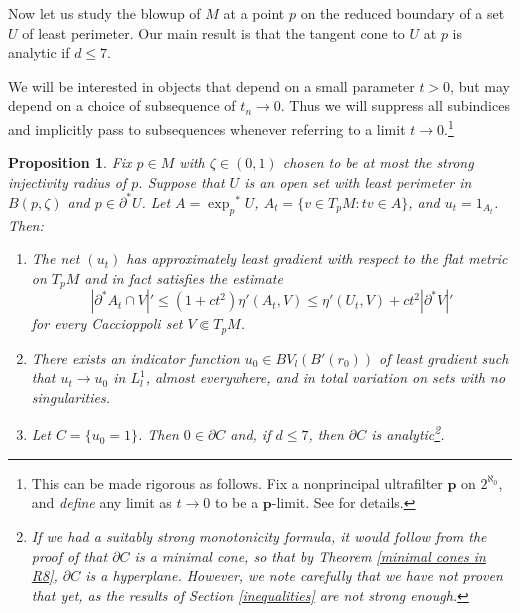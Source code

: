 \documentclass[reqno,12pt,letterpaper]{amsart}
\newtheorem{proposition}[theorem]{Proposition}
\theoremstyle{definition}
\numberwithin{equation}{section}
\begin{document}
Now let us study the blowup of $M$ at a point $p$ on the reduced boundary of a set $U$ of least perimeter.
Our main result is that the tangent cone to $U$ at $p$ is analytic if $d \leq 7$.

We will be interested in objects that depend on a small parameter $t > 0$, but may depend on a choice of subsequence of $t_n \to 0$.
Thus we will suppress all subindices and implicitly pass to subsequences whenever referring to a limit $t \to 0$.\footnote{This can be made rigorous as follows. Fix a nonprincipal ultrafilter $\mathbf p$ on $2^{\aleph_0}$, and \emph{define} any limit as $t \to 0$ to be a $\mathbf p$-limit. See \cite{Tao07} for details.}

\begin{proposition}\label{blowup theorem}
Fix $p \in M$ with $\zeta \in (0, 1)$ chosen to be at most the strong injectivity radius of $p$.
Suppose that $U$ is an open set with least perimeter in $B(p, \zeta)$ and $p \in \partial^* U$.
Let $A = {\exp_p}^* U$, $A_t = \{v \in T_pM: tv \in A\}$, and $u_t = 1_{A_t}$.
Then:
\begin{enumerate}
\item The net $(u_t)$ has approximately least gradient with respect to the flat metric on $T_pM$ and in fact satisfies the estimate
\begin{equation}\label{approximately least gradient target}|
\partial^* A_t \cap V|' \leq (1 + ct^2)\eta'(A_t, V) \leq \eta'(U_t, V) + ct^2|\partial^* V|'
\end{equation}
for every Caccioppoli set $V \Subset T_pM$.
\item There exists an indicator function $u_0 \in BV_l(B'(r_0))$ of least gradient such that $u_t \to u_0$ in $L^1_l$, almost everywhere, and in total variation on sets with no singularities.
\item Let $C = \{u_0 = 1\}$. Then $0 \in \partial C$ and, if $d \leq 7$, then $\partial C$ is analytic\footnote{If
we had a suitably strong monotonicity formula, it would follow from the proof of \cite[Theorem 9.3]{Giusti77} that $\partial C$ is a minimal cone, so that by Theorem \ref{minimal cones in R8}, $\partial C$ is a hyperplane.
However, we note carefully that we have not proven that yet, as the results of Section \ref{inequalities} are not strong enough.}.
\end{enumerate}
\end{proposition}
\end{document}
